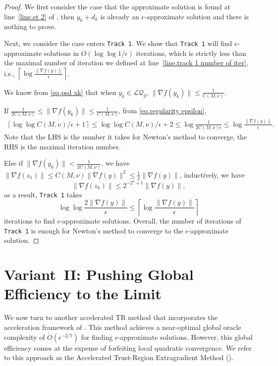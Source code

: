 \documentclass{mcom-l}
\numberwithin{equation}{section}
\begin{document}
\begin{proof}
    We first consider the case that the approximate solution is found at line~\ref{line.et 2} of , then $y_k+d_k$ is already an $\epsilon$-approximate solution and there is nothing to prove.

    Next, we consider the case  enters \texttt{Track 1}. We show that \texttt{Track 1} will find $\epsilon$-approximate solutions in $O(\log\log 1/\epsilon)$ iterations, which is strictly less than the maximal number of iteration we defined at line~\ref{line.track 1 number of iter}, i.e., $\left \lceil\log\frac{\|\nabla f(y)\|}{\epsilon} \right\rceil$.

    We know from \eqref{eq.psd xk} that when $y_k\in\mathcal{LQ}_g$, $\|\nabla f(y_k)\|\leq \frac{1}{C(M,\nu)}$.

    If $\frac{1}{2C(M,\nu)}\leq \|\nabla f(y_k)\|\leq \frac{1}{C(M,\nu)}$, from \eqref{eq.regularity epsilon},
    \begin{equation*}
        \begin{aligned}
            \left\lceil\log\log C(M,\nu)/\epsilon+1\right\rceil\leq\log\log C(M,\nu)/\epsilon+2\leq\log\frac{1}{2C(M,\nu)\epsilon}\leq\log\frac{\|\nabla f(y)\|}{\epsilon}.
        \end{aligned}
    \end{equation*}
    Note that the LHS is the number it takes for Newton's method to converge, the RHS is the maximal iteration number.

    Else if $\|\nabla f(y_k)\|< \frac{1}{2C(M,\nu)}$, we have $\|\nabla f(z_1)\|\leq C(M,\nu)\|\nabla f(y)\|^2\leq \frac{1}{2}\|\nabla f(y)\|$, inductively, we have
    \begin{equation*}
        \|\nabla f(z_k)\| \leq 2^{-2^k+1}\|\nabla f(y)\|,
    \end{equation*}
    as a result, \texttt{Track 1} takes
    \begin{equation*}
        \log\log\frac{2\|\nabla f(y)\|}{\epsilon}\leq \left \lceil \log\frac{\|\nabla f(y)\|}{\epsilon}\right \rceil
    \end{equation*}
    iterations to find $\epsilon$-approximate solutions. Overall, the number of iterations of \texttt{Track 1} is enough for Newton's method to converge to the $\epsilon$-approximate solution.
\end{proof}


\section{Variant~II: Pushing Global Efficiency to the Limit}\label{sec.second variant}
We now turn to another accelerated TR method that incorporates the acceleration framework of \citet{monteiro2013accelerated}. This method achieves a near-optimal global oracle complexity of $\tilde{O}(\epsilon^{-2/7})$ for finding $\epsilon$-approximate solutions. However, this global efficiency comes at the expense of forfeiting local quadratic convergence. We refer to this approach as the Accelerated Trust-Region Extragradient Method ().
\end{document}
